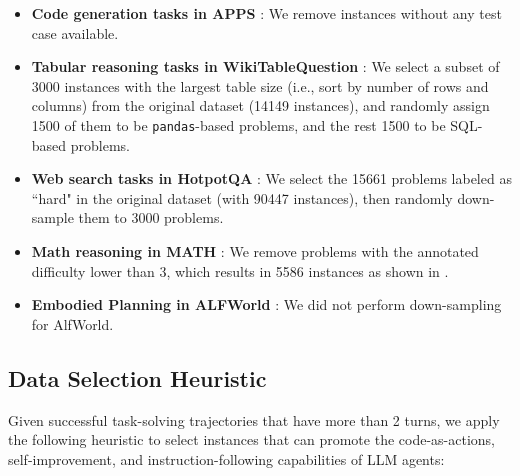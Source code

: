 \begin{itemize}
    \item \textbf{Code generation tasks in APPS} \citep{hendrycks2021measuring}: We remove instances without any test case available.

    \item \textbf{Tabular reasoning tasks in WikiTableQuestion} \citep{pasupat2015compositional}: We select a subset of 3000 instances with the largest table size (i.e., sort by number of rows and columns) from the original dataset (14149 instances), and randomly assign 1500 of them to be \texttt{pandas}-based problems, and the rest 1500 to be SQL-based problems.

    \item \textbf{Web search tasks in HotpotQA} \citep{yang2018hotpotqa}: We select the 15661 problems labeled as ``hard" in the original dataset (with 90447 instances), then randomly down-sample them to 3000 problems.

    \item \textbf{Math reasoning in MATH} \citep{hendrycks2021math}: We remove problems with the annotated difficulty lower than 3, which results in 5586 instances as shown in .

    \item \textbf{Embodied Planning in ALFWorld} \citep{shridhar2020alfworld}: We did not perform down-sampling for AlfWorld.
    
\end{itemize}


\subsection{Data Selection Heuristic}
\label{sec:data_filter_heuristic}

Given successful task-solving trajectories that have more than 2 turns, we apply the following heuristic to select instances that can promote the code-as-actions, self-improvement, and instruction-following capabilities of LLM agents: 

